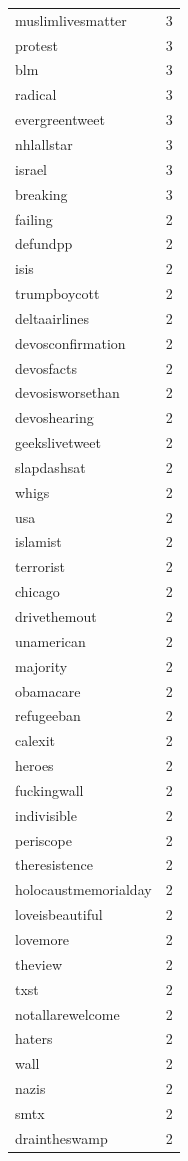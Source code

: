 \begin{tabular}{lr}
muslimlivesmatter & 3 \\
protest & 3 \\
blm & 3 \\
radical & 3 \\
evergreentweet & 3 \\
nhlallstar & 3 \\
israel & 3 \\
breaking & 3 \\
failing & 2 \\
defundpp & 2 \\
isis & 2 \\
trumpboycott & 2 \\
deltaairlines & 2 \\
devosconfirmation & 2 \\
devosfacts & 2 \\
devosisworsethan & 2 \\
devoshearing & 2 \\
geekslivetweet & 2 \\
slapdashsat & 2 \\
whigs & 2 \\
usa & 2 \\
islamist & 2 \\
terrorist & 2 \\
chicago & 2 \\
drivethemout & 2 \\
unamerican & 2 \\
majority & 2 \\
obamacare & 2 \\
refugeeban & 2 \\
calexit & 2 \\
heroes & 2 \\
fuckingwall & 2 \\
indivisible & 2 \\
periscope & 2 \\
theresistence & 2 \\
holocaustmemorialday & 2 \\
loveisbeautiful & 2 \\
lovemore & 2 \\
theview & 2 \\
txst & 2 \\
notallarewelcome & 2 \\
haters & 2 \\
wall & 2 \\
nazis & 2 \\
smtx & 2 \\
draintheswamp & 2 \\

\end{tabular}
